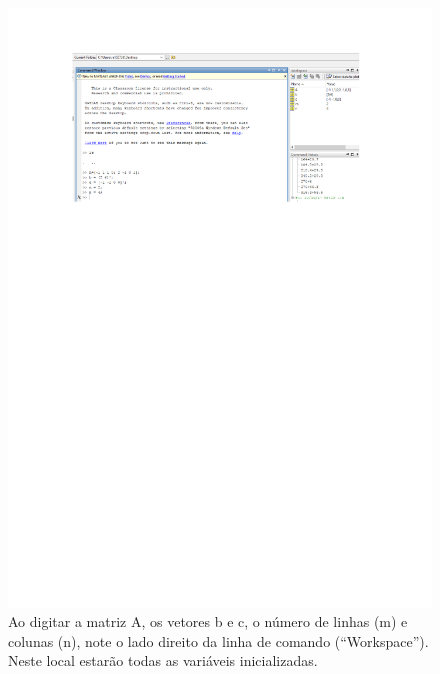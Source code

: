 \documentclass[10pt]{article}
\begin{document}
\begin{figure}[H]
    \centering
    \includegraphics[scale = 0.7]{fig6teste.pdf}
    \caption{Ao digitar a matriz A, os vetores b e c, o número de linhas (m) e colunas (n), note o lado direito da linha de comando (``Workspace''). Neste local estarão todas as variáveis inicializadas.}
\end{figure}
\end{document}
